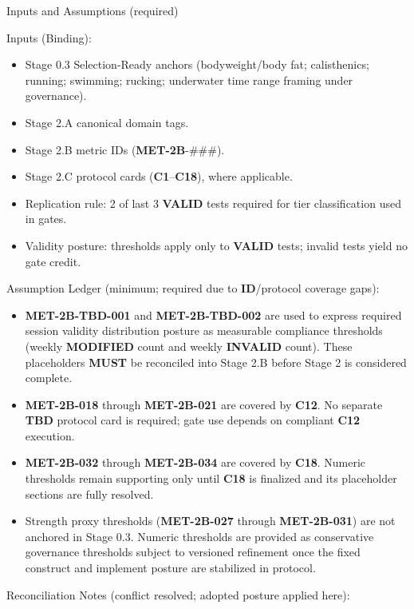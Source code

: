 \documentclass[10pt]{article}
\begin{document}
Inputs and Assumptions (required)

Inputs (Binding):

\begin{itemize}
\item Stage 0.3 Selection-Ready anchors (bodyweight/body fat; calisthenics; running; swimming; rucking; underwater time range framing under governance).
\item Stage 2.A canonical domain tags.
\item Stage 2.B metric IDs (\textbf{MET-2B}-\#\#\#).
\item Stage 2.C protocol cards (\textbf{C1}–\textbf{C18}), where applicable.
\item Replication rule: 2 of last 3 \textbf{VALID} tests required for tier classification used in gates.
\item Validity posture: thresholds apply only to \textbf{VALID} tests; invalid tests yield no gate credit.
\end{itemize}

Assumption Ledger (minimum; required due to \textbf{ID}/protocol coverage gaps):

\begin{itemize}
\item \textbf{MET-2B-TBD-001} and \textbf{MET-2B-TBD-002} are used to express required session validity distribution posture as measurable compliance thresholds (weekly \textbf{MODIFIED} count and weekly \textbf{INVALID} count). These placeholders \textbf{MUST} be reconciled into Stage 2.B before Stage 2 is considered complete.
\item \textbf{MET-2B-018} through \textbf{MET-2B-021} are covered by \textbf{C12}. No separate \textbf{TBD} protocol card is required; gate use depends on compliant \textbf{C12} execution.
\item \textbf{MET-2B-032} through \textbf{MET-2B-034} are covered by \textbf{C18}. Numeric thresholds remain supporting only until \textbf{C18} is finalized and its placeholder sections are fully resolved.
\item Strength proxy thresholds (\textbf{MET-2B-027} through \textbf{MET-2B-031}) are not anchored in Stage 0.3. Numeric thresholds are provided as conservative governance thresholds subject to versioned refinement once the fixed construct and implement posture are stabilized in protocol.
\end{itemize}

Reconciliation Notes (conflict resolved; adopted posture applied here):
\end{document}
